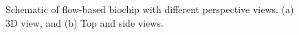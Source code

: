 \documentclass[journal]{IEEEtran}
\begin{document}
\begin{figure}[t]
\centering
{}%
\hfil
%
\caption{Schematic of flow-based biochip with different perspective views. (a) 3D view, and (b) Top and side views. }
\label{fig:schematic}
\vspace{-0.35cm}
\end{figure}
\end{document}
